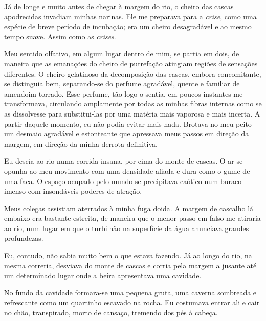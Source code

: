 
Já de longe e muito antes de chegar à margem do rio, o cheiro das cascas apodrecidas invadiam minhas narinas. Ele me preparava para a \textit{crise}, como uma espécie de breve período de incubação; era um cheiro desagradável e ao mesmo tempo suave. Assim como as \textit{crises}.

Meu sentido olfativo, em algum lugar dentro de mim, se partia em dois, de maneira que as emanações do cheiro de putrefação atingiam regiões de sensações diferentes. O cheiro gelatinoso da decomposição das cascas, embora concomitante, se distinguia bem, separando-se do perfume agradável, quente e familiar de amendoim torrado. 
Esse perfume, tão logo o sentia, em poucos instantes me transformava, circulando amplamente por todas as minhas fibras internas como se as dissolvesse para substitui-las por uma matéria mais vaporosa e mais incerta. A partir daquele momento, eu não podia evitar mais nada. Brotava no meu peito um desmaio agradável e estonteante que apressava meus passos em direção da margem, em direção da minha derrota definitiva.

Eu descia ao rio numa corrida insana, por cima do monte de cascas. O ar se opunha ao meu movimento com uma densidade afiada e dura como o gume de uma faca. O espaço ocupado pelo mundo se precipitava caótico num buraco imenso com insondáveis poderes de atração.

Meus colegas assistiam aterrados à minha fuga doida. A margem de cascalho lá embaixo era bastante estreita, de maneira que o menor passo em falso me atiraria ao rio, num lugar em que o turbilhão na superfície da água anunciava grandes profundezas.

Eu, contudo, não sabia muito bem o que estava fazendo. Já ao longo do rio, na mesma correria, desviava do monte de cascas e corria pela margem a jusante até um determinado lugar onde a beira apresentava uma cavidade.

No fundo da cavidade formara-se uma pequena gruta, uma caverna sombreada e refrescante como um quartinho escavado na rocha. Eu costumava entrar ali e cair no chão, transpirado, morto de cansaço, tremendo dos pés à cabeça.

